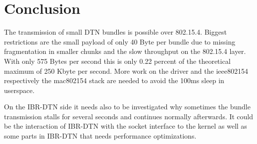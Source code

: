 \chapter{Conclusion}

The transmission of small DTN bundles is possible over 802.15.4. Biggest
restrictions are the small payload of only 40 Byte per bundle due to missing
fragmentation in smaller chunks and the slow throughput on the 802.15.4 layer.
With only 575 Bytes per second this is only 0.22 percent of the theoretical
maximum of 250 Kbyte per second. More work on the driver and the ieee802154
respectively the mac802154 stack are needed to avoid the 100ms sleep in
userspace.

On the IBR-DTN side it needs also to be investigated why sometimes the bundle
transmission stalls for several seconds and continues normally afterwards. It
could be the interaction of IBR-DTN with the socket interface to the kernel as well
as some parts in IBR-DTN that needs performance optimizations.
